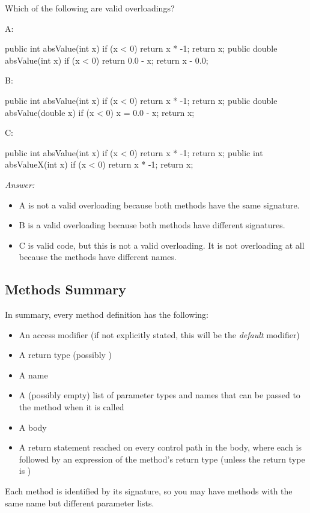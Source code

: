 \begin{example}
Which of the following are valid overloadings?

\noindent A:
\begin{code}
public int absValue(int x) {
  if (x < 0) {
    return x * -1;
  }
  return x;
}
public double absValue(int x) {
  if (x < 0) {
    return 0.0 - x;
  }
  return x - 0.0;
}
\end{code}

\noindent B:
\begin{code}
public int absValue(int x) {
  if (x < 0) {
    return x * -1;
  }
  return x;
}
public double absValue(double x) {
  if (x < 0) {
    x = 0.0 - x;
  }
  return x;
}
\end{code}

\noindent C:
\begin{code}
public int absValue(int x) {
  if (x < 0) {
    return x * -1;
  }
  return x;
}
public int absValueX(int x) {
  if (x < 0) {
    return x * -1;
  }
  return x;
}
\end{code}

\noindent \emph{Answer:}
\begin{itemize}
\item A is not a valid overloading because both methods have the same signature.
\item B is a valid overloading because both methods have different signatures.
\item C is valid code, but this is not a valid overloading. It is not overloading at all because the methods have different names.
\end{itemize}
\end{example}

\subsection{Methods Summary}
In summary, every method definition has the following:
\begin{itemize}
\item An access modifier (if not explicitly stated, this will be the \emph{default} modifier)
\item A return type (possibly )
\item A name
\item A (possibly empty) list of parameter types and names that can be passed to the method when it is called
\item A body
\item A return statement reached on every control path in the body, where each  is followed by an
expression of the method's return type (unless the return type is )
\end{itemize}
Each method is identified by its signature, so you may have methods with the same name but different parameter lists.

